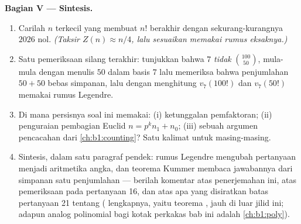 \begin{problem}
\medskip
\noindent\textbf{Bagian V --- Sintesis.}
\begin{enumerate}[resume]
  \item Carilah $n$ terkecil yang membuat $n!$ berakhir dengan sekurang-kurangnya
        $2026$ nol. \emph{(Taksir $Z(n) \approx n/4$, lalu
        sesuaikan memakai rumus eksaknya.)}
  \item Satu pemeriksaan silang terakhir: tunjukkan bahwa $7$ \emph{tidak} 
        $\binom{100}{50}$, mula-mula dengan menulis $50$ dalam basis $7$ lalu
        memeriksa bahwa penjumlahan $50 + 50$ bebas simpanan, lalu
        dengan menghitung $v_7(100!)$ dan $v_7(50!)$ memakai rumus
        Legendre.
  \item Di mana persisnya soal ini memakai: (i) ketunggalan
        pemfaktoran; (ii) penguraian pembagian Euclid
        $n = p^k n_1 + n_0$; (iii) sebuah argumen pencacahan dari
        \cref{ch:b1:counting}? Satu kalimat untuk masing-masing.
  \item Sintesis, dalam satu paragraf pendek: rumus Legendre mengubah
        pertanyaan  menjadi aritmetika angka, dan
        teorema Kummer membaca jawabannya dari simpanan satu
        penjumlahan --- berilah komentar atas penerjemahan ini, atas pemeriksaan pada
        pertanyaan 16, dan atas apa yang disiratkan batas pertanyaan 21
        tentang  ( lengkapnya, yaitu teorema , jauh di luar jilid ini; adapun analog polinomial
        bagi kotak perkakas bab ini adalah
        \cref{ch:b1:poly}).

\end{enumerate}
\end{problem}
